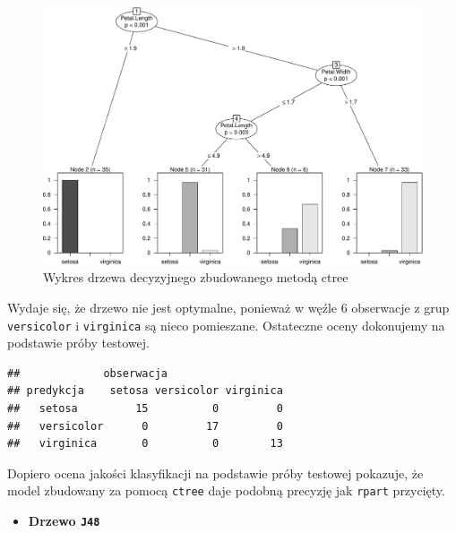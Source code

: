 \documentclass[
]{book}
\newenvironment{Shaded}{\begin{snugshade}}{\end{snugshade}}
\newcommand{\AttributeTok}[1]{\textcolor[rgb]{0.13,0.29,0.53}{#1}}
\newcommand{\FunctionTok}[1]{\textcolor[rgb]{0.13,0.29,0.53}{\textbf{#1}}}
\newcommand{\NormalTok}[1]{#1}
\newcommand{\OtherTok}[1]{\textcolor[rgb]{0.56,0.35,0.01}{#1}}
\newcommand{\SpecialCharTok}[1]{\textcolor[rgb]{0.81,0.36,0.00}{\textbf{#1}}}
\providecommand{\tightlist}{%
  \setlength{\itemsep}{0pt}\setlength{\parskip}{0pt}}
\theoremstyle{plain}
\theoremstyle{definition}
\theoremstyle{definition}
\theoremstyle{definition}
\theoremstyle{definition}
\theoremstyle{definition}
\theoremstyle{remark}
\begin{document}
\begin{figure}
\centering
\includegraphics{EksploracjaDanych_files/figure-latex/ctree-1.pdf}
\caption{\label{fig:ctree}Wykres drzewa decyzyjnego zbudowanego metodą ctree}
\end{figure}

Wydaje się, że drzewo nie jest optymalne, ponieważ w węźle 6 obserwacje z grup \texttt{versicolor} i \texttt{virginica} są nieco pomieszane. Ostateczne oceny dokonujemy na podstawie próby testowej.

\begin{Shaded}
\end{Shaded}

\begin{verbatim}
##             obserwacja
## predykcja    setosa versicolor virginica
##   setosa         15          0         0
##   versicolor      0         17         0
##   virginica       0          0        13
\end{verbatim}

Dopiero ocena jakości klasyfikacji na podstawie próby testowej pokazuje, że model zbudowany za pomocą \texttt{ctree} daje podobną precyzję jak \texttt{rpart} przycięty.

\begin{itemize}
\tightlist
\item
  \textbf{Drzewo \texttt{J48}}
\end{itemize}
\end{document}

